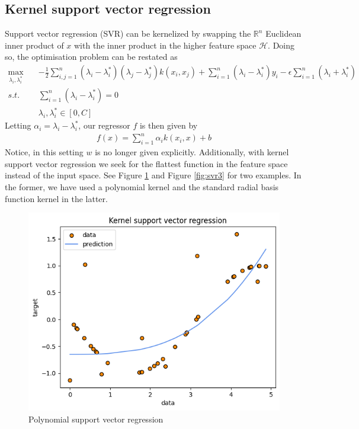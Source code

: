 \subsection{Kernel support vector regression}
Support vector regression (SVR) can be kernelized by swapping the $\mathbb{R}^n$ Euclidean inner product of $x$ with the inner product in the higher feature space $\mathcal{H}$. Doing so, the optimisation problem can be restated as
\begin{equation}
    \begin{aligned}
        \max_{\lambda_i, \lambda_i^*} \quad& -\frac{1}{2}\sum\limits_{i,j=1}^n(\lambda_i-\lambda_i^*)(\lambda_j-\lambda_j^*)k(x_i, x_j)+\sum\limits_{i=1}^n(\lambda_i-\lambda_i^*)y_i-\epsilon \sum\limits_{i=1}^n(\lambda_i+\lambda_i^*)
        \\
        s.t. \quad& \sum\limits_{i=1}^n(\lambda_i-\lambda_i^*)=0
        \\
        \quad& \lambda_i, \lambda_i^* \in [0,C]
    \end{aligned}
\end{equation}
Letting $\alpha_i=\lambda_i - \lambda_i^*$, our regressor $f$ is then given by
\begin{equation}
    \begin{aligned}
        f(x)=\sum\limits_{i=1}^n \alpha_i k(x_i, x)+b
    \end{aligned}
\end{equation}
Notice, in this setting $w$ is no longer given explicitly. Additionally, with kernel support vector regression we seek for the flattest function in the feature space instead of the input space.
See Figure \ref{fig:svr2} and Figure \ref{fig:svr3} for two examples. In the former, we have used a polynomial kernel and the standard radial basis function kernel in the latter.
\begin{figure}
    \includegraphics[width=\textwidth]{images/svr2.png}
    \caption{Polynomial support vector regression}
    \label{fig:svr2}
\end{figure}
